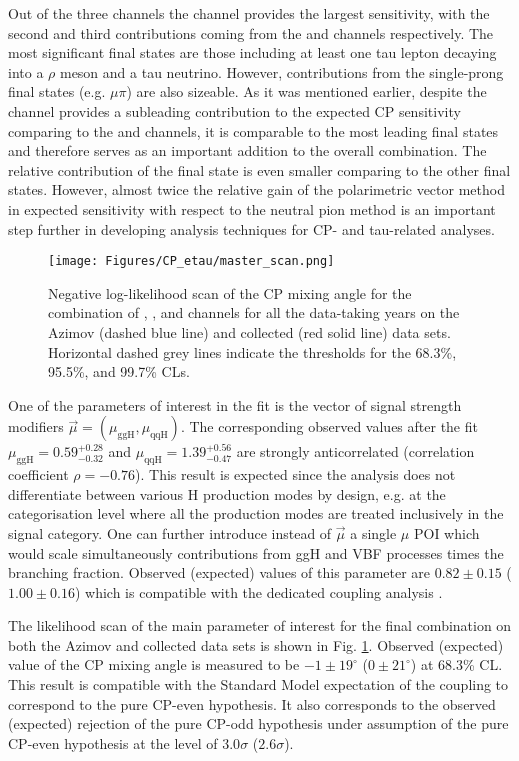 Out of the three channels the \tata channel provides the largest sensitivity, with the second and third contributions coming from the \mt and \et channels respectively. The most significant final states are those including at least one tau lepton decaying into a $\rho$ meson and a tau neutrino. However, contributions from the single-prong final states (e.g. $\mu\pi$) are also sizeable. As it was mentioned earlier, despite the \et channel provides a subleading contribution to the expected CP sensitivity comparing to the \mt and \tata channels, it is comparable to the most leading final states and therefore serves as an important addition to the overall combination. The relative contribution of the \aaa final state is even smaller comparing to the other final states. However, almost twice the relative gain of the polarimetric vector method in expected sensitivity with respect to the neutral pion method is an important step further in developing analysis techniques for CP- and tau-related analyses.

\begin{figure}[h!]
    \centering
    \texttt{[image: Figures/CP\_etau/master\_scan.png]}
    \caption{Negative log-likelihood scan of the CP mixing angle \mixa for the combination of \mt, \et, and \tata channels for all the data-taking years on the Azimov (dashed blue line) and collected (red solid line) data sets. Horizontal dashed grey lines indicate the thresholds for the 68.3\%, 95.5\%, and 99.7\% CLs.}
    \label{fig:master_scan}
\end{figure}

One of the parameters of interest in the fit is the vector of signal strength modifiers $\vec{\mu} = (\mu_\text{ggH}, \mu_\text{qqH})$. The corresponding observed values after the fit $\mu_\text{ggH} = 0.59^{+0.28}_{-0.32}$ and $\mu_\text{qqH} = 1.39^{+0.56}_{-0.47}$ are strongly anticorrelated (correlation coefficient $\rho = -0.76$). This result is expected since the analysis does not differentiate between various H production modes by design, e.g. at the categorisation level where all the production modes are treated inclusively in the signal category. One can further introduce instead of $\vec{\mu}$ a single $\mu$ POI which would scale simultaneously contributions from ggH and VBF processes times the \htt branching fraction. Observed (expected) values of this parameter are $0.82 \pm 0.15$ ($1.00 \pm 0.16$) which is compatible with the dedicated \htt coupling analysis \cite{CMS:2022kdi}. 

The likelihood scan of the main parameter of interest \mixa for the final combination on both the Azimov and collected data sets is shown in Fig. \ref{fig:master_scan}. Observed (expected) value of the CP mixing angle is measured to be $-1\pm19^\circ$ ($0\pm21^\circ$) at 68.3\% CL. This result is compatible with the Standard Model expectation of the \htt coupling to correspond to the pure CP-even hypothesis. It also corresponds to the observed (expected) rejection of the pure CP-odd hypothesis under assumption of the pure CP-even hypothesis at the level of $3.0\sigma$ ($2.6\sigma$). 

